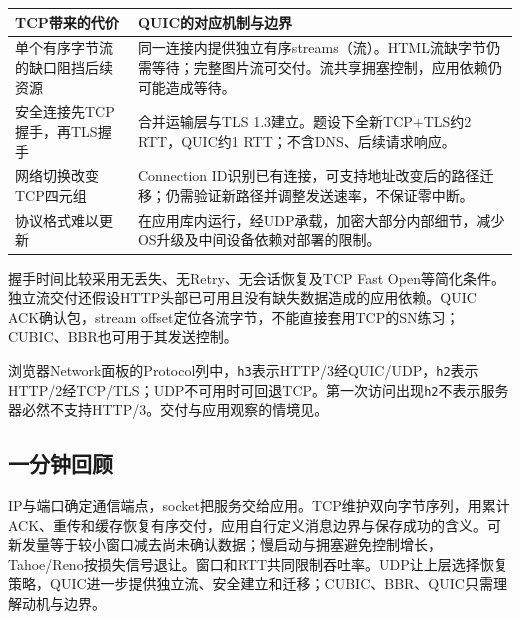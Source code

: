 \begin{center}
\small
\begin{tabularx}{\textwidth}{@{}>{\raggedright\arraybackslash}p{3.8cm}X@{}}
\toprule
TCP带来的代价 & QUIC的对应机制与边界 \\
\midrule
单个有序字节流的缺口阻挡后续资源 & 同一连接内提供独立有序streams（流）。HTML流缺字节仍需等待；完整图片流可交付。流共享拥塞控制，应用依赖仍可能造成等待。 \\
安全连接先TCP握手，再TLS握手 & 合并运输层与TLS 1.3建立。题设下全新TCP+TLS约2 RTT，QUIC约1 RTT；不含DNS、后续请求响应。 \\
网络切换改变TCP四元组 & Connection ID识别已有连接，可支持地址改变后的路径迁移；仍需验证新路径并调整发送速率，不保证零中断。 \\
协议格式难以更新 & 在应用库内运行，经UDP承载，加密大部分内部细节，减少OS升级及中间设备依赖对部署的限制。 \\
\bottomrule
\end{tabularx}
\end{center}

握手时间比较采用无丢失、无Retry、无会话恢复及TCP Fast Open等简化条件。独立流交付还假设HTTP头部已可用且没有缺失数据造成的应用依赖。QUIC ACK确认包，stream offset定位各流字节，不能直接套用TCP的SN练习；CUBIC、BBR也可用于其发送控制。

浏览器Network面板的Protocol列中，\texttt{h3}表示HTTP/3经QUIC/UDP，\texttt{h2}表示HTTP/2经TCP/TLS；UDP不可用时可回退TCP。第一次访问出现\texttt{h2}不表示服务器必然不支持HTTP/3。交付与应用观察的情境见。

\subsection{一分钟回顾}

IP与端口确定通信端点，socket把服务交给应用。TCP维护双向字节序列，用累计ACK、重传和缓存恢复有序交付，应用自行定义消息边界与保存成功的含义。可新发量等于较小窗口减去尚未确认数据；慢启动与拥塞避免控制增长，Tahoe/Reno按损失信号退让。窗口和RTT共同限制吞吐率。UDP让上层选择恢复策略，QUIC进一步提供独立流、安全建立和迁移；CUBIC、BBR、QUIC只需理解动机与边界。
\endgroup
